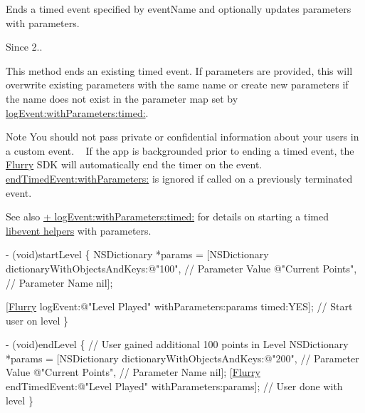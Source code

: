 Ends a timed event specified by {\ttfamily event\+Name} and optionally updates parameters with {\ttfamily parameters}. 

\begin{DoxySince}{Since}
2..
\end{DoxySince}
This method ends an existing timed event. If parameters are provided, this will overwrite existing parameters with the same name or create new parameters if the name does not exist in the parameter map set by \hyperlink{interfaceFlurry_a66eeaeb9725692dc354fdd350c691cfc}{log\+Event\+:with\+Parameters\+:timed\+:}.

\begin{DoxyNote}{Note}
You should not pass private or confidential information about your users in a custom event. ~\newline
 If the app is backgrounded prior to ending a timed event, the \hyperlink{interfaceFlurry}{Flurry} S\+DK will automatically end the timer on the event. ~\newline
 \hyperlink{interfaceFlurry_a9540add7440d1b716bfb8fb8efa85801}{end\+Timed\+Event\+:with\+Parameters\+:} is ignored if called on a previously terminated event.
\end{DoxyNote}
\begin{DoxySeeAlso}{See also}
\hyperlink{interfaceFlurry_a66eeaeb9725692dc354fdd350c691cfc}{+ log\+Event\+:with\+Parameters\+:timed\+:} for details on starting a timed \hyperlink{group__event}{libevent helpers} with parameters.
\end{DoxySeeAlso}

\begin{DoxyCode}
   - (void)startLevel 
\{
NSDictionary *params =
[NSDictionary dictionaryWithObjectsAndKeys:\textcolor{stringliteral}{@"100"}, \textcolor{comment}{// Parameter Value}
\textcolor{stringliteral}{@"Current Points"}, \textcolor{comment}{// Parameter Name}
nil];

[\hyperlink{interfaceFlurry}{Flurry} logEvent:\textcolor{stringliteral}{@"Level Played"} withParameters:params timed:YES];
\textcolor{comment}{// Start user on level}
\}

- (void)endLevel 
\{
\textcolor{comment}{// User gained additional 100 points in Level}
NSDictionary *params =
[NSDictionary dictionaryWithObjectsAndKeys:\textcolor{stringliteral}{@"200"}, \textcolor{comment}{// Parameter Value}
\textcolor{stringliteral}{@"Current Points"}, \textcolor{comment}{// Parameter Name}
nil];
[\hyperlink{interfaceFlurry}{Flurry} endTimedEvent:\textcolor{stringliteral}{@"Level Played"} withParameters:params];
\textcolor{comment}{// User done with level}
\}
\end{DoxyCode}



